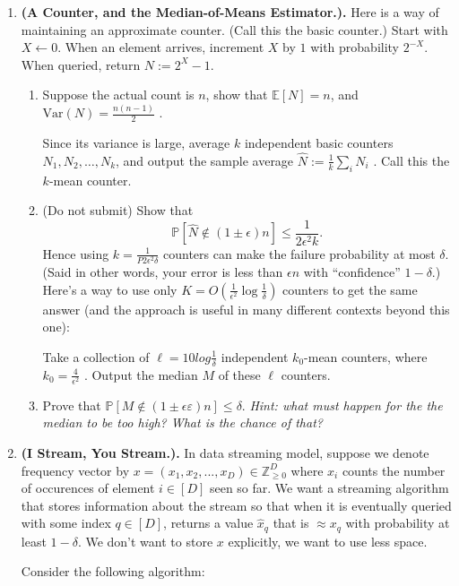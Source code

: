 \documentclass{article}
\theoremstyle{plain}
\newcommand{\E}{\mathbb{E}}
\renewcommand{\P}{\mathbb{P}}
\newcommand\litem[1]{\item{\bfseries#1.\space}}
\newcommand{\Z}{\mathbb{Z}}
\begin{document}
\begin{enumerate}
  \litem{(A Counter, and the Median-of-Means Estimator.)} Here is a
  way of maintaining an approximate counter. (Call this the basic
  counter.)  Start with $X \gets 0$. When an element arrives, increment $X$ by
  $1$ with probability $2^{-X}$. When queried, return $N := 2^X - 1$.
  \begin{enumerate}
  \item Suppose the actual count is $n$, show that $\E[N] = n$, and
    $\textrm{Var}(N) = \frac{n(n-1)}{ 2}$ .

    Since its variance is large, average $k$ independent basic
    counters $N_1, N_2, \ldots, N_k$, and output the sample average
    $\hat{N} := \frac{1}{k}\sum_i N_i$ . Call this the $k$-mean counter.
  \item (Do not submit) Show that
   \[\P[\hat{N} \notin  (1 \pm \epsilon)n] \leq \frac{1}{2\epsilon^2 k}.\]
   Hence using $k = \frac{1}{P 2\epsilon^2 \delta}$ counters can make
     the failure probability at most $\delta$. (Said in other words,
     your error is less than $\epsilon n$ with “confidence”
     $1 -\delta$.) Here’s a way to use only
     $K = O( \frac{1}{ \epsilon^2}\log\frac{ 1}{\delta})$ counters to
     get the same answer (and the approach is useful in many different
     contexts beyond this one):

     Take a collection of $\ell = 10 log\frac{ 1 }{\delta}$
     independent $k_0$-mean counters, where $k_0 =\frac{4}{ \epsilon^ 2}$ .  Output the
     median $M$ of these $\ell$ counters.

   \item Prove that $\P[M \notin (1 \pm \epsilon ε)n] \leq
     \delta$. {\it Hint: what must happen for the the median to be too
       high?  What is the chance of that?}
   \end{enumerate}

   \litem{(I Stream, You Stream.)} In data streaming model, suppose we
   denote frequency vector by
   $x = (x_1, x_2, . . . , x_D) \in \Z^D_{\geq 0}$ where $x_i$ counts
   the number of occurences of element $i \in [D]$ seen so far. We
   want a streaming algorithm that stores information about the stream
   so that when it is eventually queried with some index $q \in [D]$,
   returns a value $\hat{x}_q$ that is $\approx x_q$ with probability
   at least $1 -\delta$. We don’t want to store $x$ explicitly, we want
   to use less space.

   Consider the following algorithm:


\end{enumerate}
\end{document}
